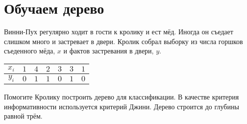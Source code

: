 \documentclass[12pt,a4paper]{article}
\begin{document}
\section{Обучаем дерево}

\begin{vkProblem}
    Винни-Пух регулярно ходит в гости к кролику и ест мёд. Иногда он съедает слишком много и застревает в двери. Кролик собрал выборку из числа горшков съеденного мёда, $x$ и фактов застревания в двери, $y$.

    \begin{center}
        \begin{tabular}{c|c|c|c|c|c|c}
        $x_i$ & $1$ & $4$ & $2$ & $3$ & $3$ & $1$   \\ \hline
        $y_i$ & $0$ & $1$ & $1$ & $0$ & $1$ & $0$
    \end{tabular}
    \end{center}

    Помогите Кролику построить дерево для классификации. В качестве критерия информативности используется критерий Джини. Дерево строится до глубины равной трём.
\end{vkProblem}
\end{document}
